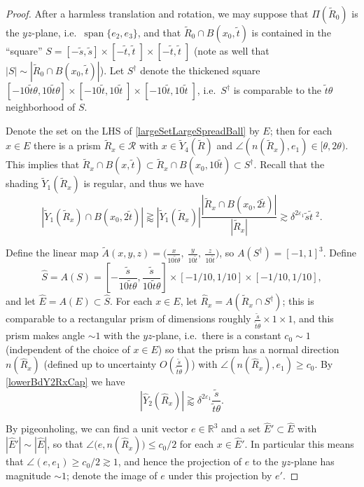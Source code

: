 \documentclass[letterpaper, reqno,11pt]{article}
\numberwithin{equation}{section}
\newcommand{\RR}{\mathbb{R}}
\newcommand{\eps}{\varepsilon}
\numberwithin{thm}{section}
\theoremstyle{remark}
\begin{document}
\begin{proof}
After a harmless translation and rotation, we may suppose that  $\Pi(\tilde R_0)$ is the $yz$-plane, i.e.~$\operatorname{span}\{e_2,e_3\}$, and that $\tilde R_0\cap B(x_0,\tilde t)$ is contained in the ``square'' $S=[-\tilde s, \tilde s]\times [-\tilde t, \tilde t\phantom{.}]\times[-\tilde t, \tilde t\phantom{.}]$ (note as well that $|S|\sim |\tilde R_0\cap B(x_0,\tilde t)|$). Let $S^{\dag}$ denote the thickened square $[-10\tilde t\theta, 10\tilde t\theta]\times [-10\tilde t,10\tilde t\phantom{.}]\times[-10\tilde t,10\tilde t\phantom{.}]$, i.e.~$S^{\dag}$ is comparable to the $\tilde t\theta$ neighborhood of $S$.

Denote the set on the LHS of \eqref{largeSetLargeSpreadBall} by $E$; then for each $x\in E$ there is a prism $\tilde R_x\in\mathcal{R}$ with $x\in \tilde Y_4(\tilde R)$ and $\angle(n(\tilde R_x), e_1)\in [\theta, 2\theta)$. This implies that $\tilde R_x \cap B(x,\tilde t) \subset \tilde R_x \cap B(x_0,10\tilde t)\subset S^{\dag}$. Recall that the shading $\tilde Y_1(\tilde R_x)$ is regular, and thus we have
\begin{equation}\label{lowerBdY2RxCap}
|\tilde Y_1(\tilde R_x)\cap B(x_0,2\tilde t)|\gtrapprox |\tilde Y_1(\tilde R_x)|\frac{|\tilde R_x\cap B(x_0,2\tilde t)|}{|\tilde R_x|}\gtrsim \delta^{2\eps_1}\tilde s\tilde t\phantom{.}^2.
\end{equation}

Define the linear map $\tilde A(x,y,z)=\Big( \frac{ x}{10\tilde t\theta},\ \frac{y}{10\tilde t},\ \frac{z}{10\tilde t}\Big)$, so $A(S^{\dag})=[-1,1]^3$. Define 
\[
\hat S=A(S)=[-\frac{\tilde s}{10\tilde t\theta},\frac{\tilde s}{10\tilde t\theta}]\times[-1/10,1/10]\times[-1/10,1/10],
\] 
and let $\hat E = A(E)\subset\hat S$. For each $x\in E$, let $\hat R_x = A(\tilde R_x\cap S^\dag)$; this is comparable to a rectangular prism of dimensions roughly $\frac{\tilde s}{\tilde t\theta}\times 1\times 1$, and this prism makes angle $\sim 1$ with the $yz$-plane, i.e.~there is a constant $c_0\sim 1$ (independent of the choice of $x\in E$) so that the prism has a normal direction $ n(\hat R_x)$ (defined up to uncertainty $O(\frac{\tilde s}{\tilde t\theta})$) with $\angle(n(\hat R_x), e_1)\geq c_0$. By \eqref{lowerBdY2RxCap} we have
\begin{equation}\label{lowerBdY2RxHat}
|\hat Y_2(\hat R_x)|\gtrapprox \delta^{2\eps_1}\frac{\tilde s}{\tilde t\theta}.
\end{equation}


By pigeonholing, we can find a unit vector $e\in\RR^3$ and a set $\hat E'\subset\hat E$ with $|\hat E'|\sim |\hat E|$, so that $\angle\big(e,  n(\hat R_x)\big)\leq c_0/2$ for each $x\in \hat E'$. In particular this means that $\angle(e,e_1)\geq c_0/2\gtrsim  1$,  and hence the projection of $e$ to the $yz$-plane has magnitude $\sim 1$; denote the image of $e$ under this projection by $e'$. 


\end{proof}
\end{document}
